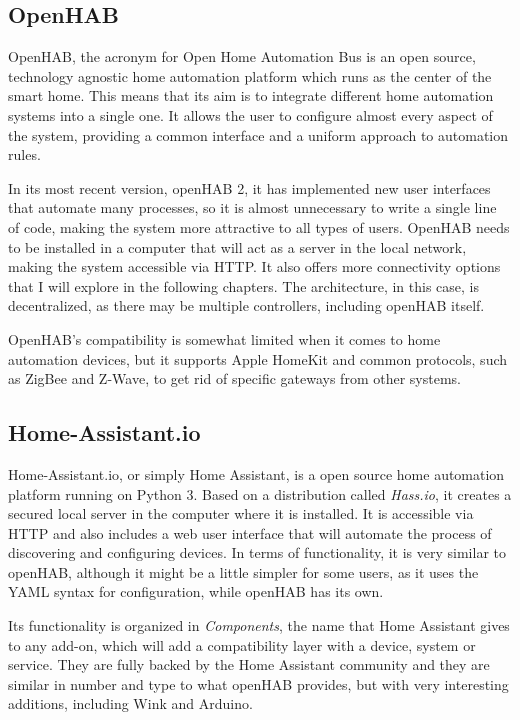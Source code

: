 \subsection{OpenHAB}
OpenHAB, the acronym for Open Home Automation Bus is an open source, technology agnostic home automation platform which runs
as the center of the smart home. \cite{openHABDocs} This means that its aim is to integrate different home automation systems into
a single one. It allows the user to configure almost every aspect of the system, providing a common interface and a uniform approach 
to automation rules.

In its most recent version, openHAB 2, it has implemented new user interfaces that automate many processes, so it is almost unnecessary
to write a single line of code, making the system more attractive to all types of users. OpenHAB needs to be installed in a computer that 
will act as a server in the local network, making the system accessible via HTTP. It also offers more connectivity options that I will explore 
in the following chapters. The architecture, in this case, is decentralized, as there may be multiple controllers, including openHAB itself.

OpenHAB's compatibility is somewhat limited when it comes to home automation devices, but it supports Apple HomeKit and common 
protocols, such as ZigBee and Z-Wave, to get rid of specific gateways from other systems.\cite{openHABAddons} 

\subsection{Home-Assistant.io}
Home-Assistant.io, or simply Home Assistant, is a open source home automation platform running on Python 3.\cite{homeAssistantio}
Based on a distribution called \textit{Hass.io}, it creates a secured local server in the computer where it is installed. It is accessible via 
HTTP and also includes a web user interface that will automate the process of discovering and configuring devices. In terms of 
functionality, it is very similar to openHAB, although it might be a little simpler for some users, as it uses the YAML syntax for 
configuration, while openHAB has its own.

Its functionality is organized in \textit{Components}, the name that Home Assistant gives to any add-on, which will add a compatibility
layer with a device, system or service. They are fully backed by the Home Assistant community and they are similar in number and type to
what openHAB provides, but with very interesting additions, including Wink and Arduino.

